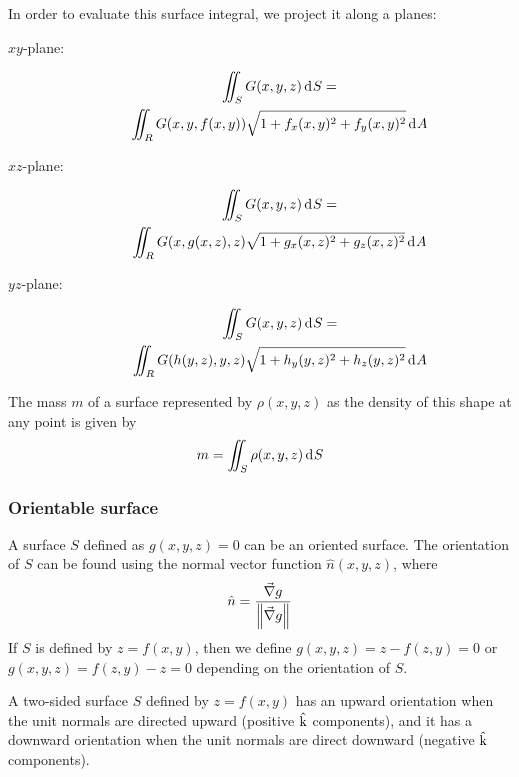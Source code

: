 \documentclass[10pt, twocolumn]{article}
\theoremstyle{remark}
\begin{document}
In order to evaluate this surface integral, we project it along a planes:
\begin{description}
  \item[\(xy\)-plane:]
        \begin{multline*}
          \iint_S {G(x, y, z)\,\mathrm{d}^{} S} = \\
          \iint_R {G(x, y, f(x, y))\sqrt{1 + f_x (x, y)^2 + f_y (x, y)^2 }\,\mathrm{d}^{} A}
        \end{multline*}
  \item[\(xz\)-plane:]
        \begin{multline*}
          \iint_S {G(x, y, z)\,\mathrm{d}^{} S} = \\
          \iint_R {G(x, g(x, z), z)\sqrt{1 + g_x (x, z)^2 + g_z (x, z)^2 }\,\mathrm{d}^{} A}
        \end{multline*}
  \item[\(yz\)-plane:]
        \begin{multline*}
          \iint_S {G(x, y, z)\,\mathrm{d}^{} S} = \\
          \iint_R {G(h(y, z), y, z)\sqrt{1 + h_y (y, z)^2 + h_z (y, z)^2 }\,\mathrm{d}^{} A}
        \end{multline*}
\end{description}

The mass \(m\) of a surface represented by \(\rho(x, y, z)\) as the density of this shape at any point is given by
\[
  m = \iint_S {\rho(x, y, z)\,\mathrm{d}^{} S}
\]

\subsubsection*{Orientable surface}
A surface \(S\) defined as \(g(x, y, z) = 0\) can be an oriented surface.
The orientation of \(S\) can be found using the normal vector function \(\hat{n}(x, y, z)\), where
\[
  \hat{n} = \frac{\vec{\nabla}g}{\left\| \vec{\nabla}g \right\|}
\]
If \(S\) is defined by \(z = f(x, y)\), then we define \(g(x, y, z) = z - f(z, y) = 0\) or \(g(x, y, z) = f(z, y) - z = 0\) depending on the orientation of \(S\).

A two-sided surface \(S\) defined by \(z = f(x, y)\) has an upward orientation when the unit normals are directed upward (positive \(\hat{\mathrm{k}}\) components), and it has a downward orientation when the unit normals are direct downward (negative \(\hat{\mathrm{k}}\) components).
\end{document}
